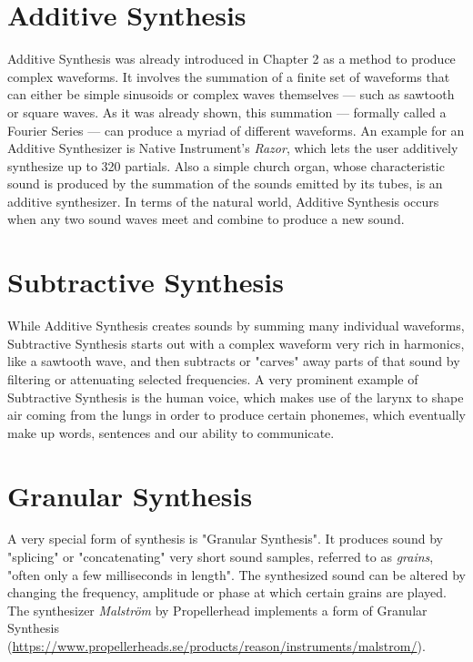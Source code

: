 \documentclass[12pt,twoside]{report}
\begin{document}
\section{Additive Synthesis}

Additive Synthesis was already introduced in Chapter 2 as a method to produce complex waveforms. It involves the summation of a finite set of waveforms that can either be simple sinusoids or complex waves themselves --- such as sawtooth or square waves. As it was already shown, this summation --- formally called a Fourier Series --- can produce a myriad of different waveforms. An example for an Additive Synthesizer is Native Instrument's \emph{Razor}, which lets the user additively synthesize up to 320 partials. Also a simple church organ, whose characteristic sound is produced by the summation of the sounds emitted by its tubes, is an additive synthesizer. In terms of the natural world, Additive Synthesis occurs when any two sound waves meet and combine to produce a new sound.

\section{Subtractive Synthesis}

While Additive Synthesis creates sounds by summing many individual waveforms, Subtractive Synthesis starts out with a complex waveform very rich in harmonics, like a sawtooth wave, and then subtracts or "carves" away parts of that sound by filtering or attenuating selected frequencies. A very prominent example of Subtractive Synthesis is the human voice, which makes use of the larynx to shape air coming from the lungs in order to produce certain phonemes, which eventually make up words, sentences and our ability to communicate.

\section{Granular Synthesis}

A very special form of synthesis is "Granular Synthesis". It produces sound by "splicing" or "concatenating" very short sound samples, referred to as \emph{grains}, "often only a few milliseconds in length".  The synthesized sound can be altered by changing the frequency, amplitude or phase at which certain grains are played. The synthesizer \emph{Malstr{\"o}m} by Propellerhead implements a form of Granular Synthesis (\url{https://www.propellerheads.se/products/reason/instruments/malstrom/}).
\end{document}

